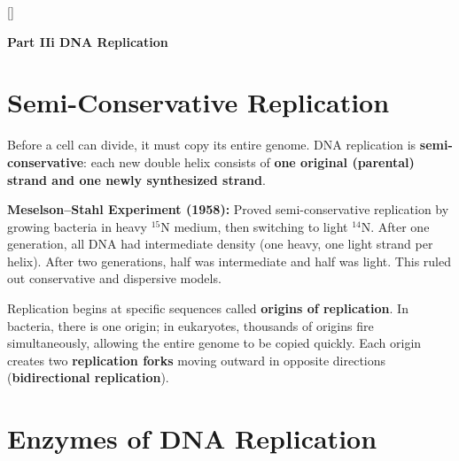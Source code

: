 \documentclass[11pt, letterpaper]{article}
\newcommand{\orangesections}{%
  \titleformat{\section}{\large\bfseries\color{sectionorange}}{}{0em}{}[\color{sectionorange}\titlerule]%
  \titleformat{\subsection}{\normalsize\bfseries\color{sectionorange!80!black}}{}{0em}{}%
}
\newcommand{\partbanner}[3]{%
  \begin{tcolorbox}[colback=#1, colframe=#2, boxrule=1.2pt, arc=4pt,
    left=8pt, right=8pt, top=6pt, bottom=6pt]
    \begin{center}{\LARGE\bfseries #3}\end{center}
  \end{tcolorbox}%
}
\begin{document}
\newpage

\orangesections
{}
\partbanner{part4bg}{sectionorange}{Part IIi \quad DNA Replication}

\vspace{8pt}

\section*{Semi-Conservative Replication}

Before a cell can divide, it must copy its entire genome. DNA replication is
\textbf{semi-conservative}: each new double helix consists of \textbf{one original (parental)
strand and one newly synthesized strand}.

\begin{tcolorbox}[colback=part4bg, colframe=sectionorange, arc=3pt, boxrule=1pt]
\textbf{Meselson--Stahl Experiment (1958):} Proved semi-conservative replication by growing
bacteria in heavy $^{15}$N medium, then switching to light $^{14}$N. After one generation,
all DNA had intermediate density (one heavy, one light strand per helix). After two generations,
half was intermediate and half was light. This ruled out conservative and dispersive models.
\end{tcolorbox}

Replication begins at specific sequences called \textbf{origins of replication}. In bacteria,
there is one origin; in eukaryotes, thousands of origins fire simultaneously, allowing the
entire genome to be copied quickly. Each origin creates two \textbf{replication forks} moving
outward in opposite directions (\textbf{bidirectional replication}).

\section*{Enzymes of DNA Replication}
\end{document}
